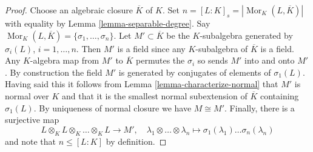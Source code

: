 \documentclass[10pt,a4paper]{amsart}
\theoremstyle{plain}
\theoremstyle{definition}
\theoremstyle{remark}
\numberwithin{equation}{subsection}
\def\Mor{\mathop{\mathrm{Mor}}\nolimits}
\begin{document}
\begin{proof}
Choose an algebraic closure $\overline{K}$ of $K$.
Set $n = [L : K]_s = |\Mor_K(L, \overline{K})|$ with equality by
Lemma \ref{lemma-separable-degree}.
Say $\Mor_K(L, \overline{K}) = \{\sigma_1, \ldots, \sigma_n\}$.
Let $M' \subset \overline{K}$ be the $K$-subalgebra
generated by $\sigma_i(L)$, $i = 1, \ldots, n$. Then $M'$ is
a field since any $K$-subalgebra of $\overline{K}$ is a field.
Any $K$-algebra map from $M'$ to $\overline{K}$ permutes the $\sigma_i$
so sends $M'$ into and onto $M'$. By construction the field $M'$
is generated by conjugates of elements of $\sigma_1(L)$. Having said
this it follows from Lemma \ref{lemma-characterize-normal}
that $M'$ is normal over $K$ and that it is the
smallest normal subextension of $\overline{K}$ containing
$\sigma_1(L)$. By uniqueness of normal closure we have $M \cong M'$.
Finally, there is a surjective map
$$
L \otimes_K L \otimes_K \ldots \otimes_K L \longrightarrow M',
\quad
\lambda_1 \otimes \ldots \otimes \lambda_n \longmapsto
\sigma_1(\lambda_1) \ldots \sigma_n(\lambda_n)
$$
and note that $n \leq [L : K]$ by definition.
\end{proof}
\end{document}
